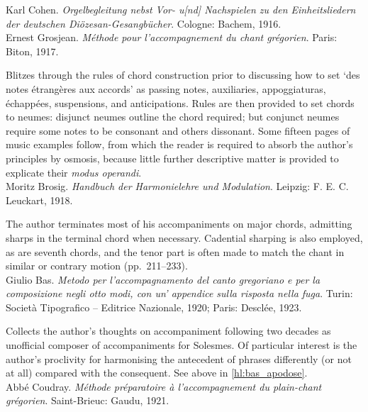     \parindent=0pt
    \hangindent=0pt
  \covid{}Karl Cohen. \emph{Orgelbegleitung nebst Vor- u[nd] Nachspielen zu den Einheitsliedern der deutschen Diözesan-Gesangbücher}. Cologne:  Bachem, 1916. \\

    \parindent=0pt
    \hangindent=0pt
  Ernest Grosjean. \emph{Méthode pour l'accompagnement du chant grégorien}. Paris:  Biton, 1917.

     \parindent=20pt
     \hangindent=20pt
     Blitzes through the rules of chord construction prior to discussing how to set `des notes étrangères aux accords' as passing notes, auxiliaries, appoggiaturas, échappées, suspensions, and anticipations. Rules are then provided to set chords to neumes: disjunct neumes outline the chord required; but conjunct neumes require some notes to be consonant and others dissonant. Some fifteen pages of music examples follow, from which the reader is required to absorb the author's principles by osmosis, because little further descriptive matter is provided to explicate their \emph{modus operandi}.\\

    \parindent=0pt
    \hangindent=0pt
  Moritz Brosig. \emph{Handbuch der Harmonielehre und Modulation}. Leipzig:  F. E. C. Leuckart, 1918.

     \parindent=20pt
     \hangindent=20pt
     The author terminates most of his accompaniments on major chords, admitting sharps in the terminal chord when necessary. Cadential sharping is also employed, as are seventh chords, and the tenor part is often made to match the chant in similar or contrary motion (pp.~211--233).\\

    \parindent=0pt
    \hangindent=0pt
  Giulio Bas. \emph{Metodo per l'accompagnamento del canto gregoriano e per la composizione negli otto modi, con un' appendice sulla risposta nella fuga}. Turin:  Società Tipografico -- Editrice Nazionale, 1920;  Paris:  Desclée, 1923.

     \parindent=20pt
     \hangindent=20pt
     Collects the author's thoughts on accompaniment following two decades as unofficial composer of accompaniments for Solesmes. Of particular interest is the author's proclivity for harmonising the antecedent of phrases differently (or not at all) compared with the consequent. See above in \cref{hl:bas_apodose}.\\

    \parindent=0pt
    \hangindent=0pt
  \covid{}Abbé Coudray. \emph{Méthode préparatoire à l'accompagnement du plain-chant grégorien}. Saint-Brieuc:  Gaudu, 1921. \\

